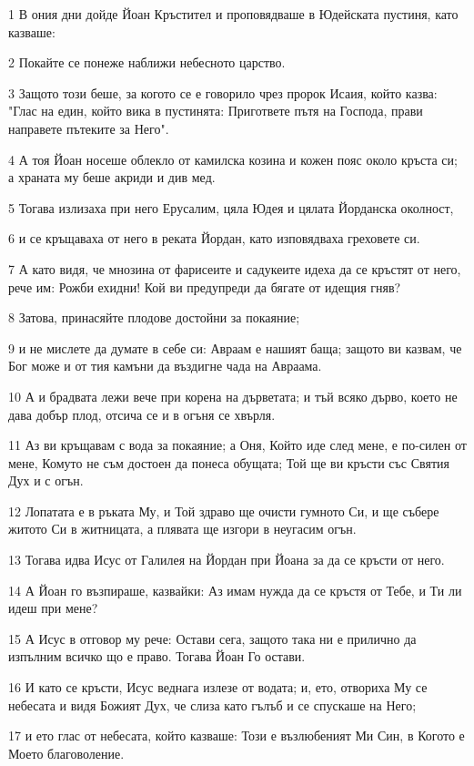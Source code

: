 \par 1 В ония дни дойде Йоан Кръстител и проповядваше в Юдейската пустиня, като казваше:
\par 2 Покайте се понеже наближи небесното царство.
\par 3 Защото този беше, за когото се е говорило чрез пророк Исаия, който казва: "Глас на един, който вика в пустинята: Пригответе пътя на Господа, прави направете пътеките за Него".
\par 4 А тоя Йоан носеше облекло от камилска козина и кожен пояс около кръста си; а храната му беше акриди и див мед.
\par 5 Тогава излизаха при него Ерусалим, цяла Юдея и цялата Йорданска околност,
\par 6 и се кръщаваха от него в реката Йордан, като изповядваха греховете си.
\par 7 А като видя, че мнозина от фарисеите и садукеите идеха да се кръстят от него, рече им: Рожби ехидни! Кой ви предупреди да бягате от идещия гняв?
\par 8 Затова, принасяйте плодове достойни за покаяние;
\par 9 и не мислете да думате в себе си: Авраам е нашият баща; защото ви казвам, че Бог може и от тия камъни да въздигне чада на Авраама.
\par 10 А и брадвата лежи вече при корена на дърветата; и тъй всяко дърво, което не дава добър плод, отсича се и в огъня се хвърля.
\par 11 Аз ви кръщавам с вода за покаяние; а Оня, Който иде след мене, е по-силен от мене, Комуто не съм достоен да понеса обущата; Той ще ви кръсти със Святия Дух и с огън.
\par 12 Лопатата е в ръката Му, и Той здраво ще очисти гумното Си, и ще събере житото Си в житницата, а плявата ще изгори в неугасим огън.
\par 13 Тогава идва Исус от Галилея на Йордан при Йоана за да се кръсти от него.
\par 14 А Йоан го възпираше, казвайки: Аз имам нужда да се кръстя от Тебе, и Ти ли идеш при мене?
\par 15 А Исус в отговор му рече: Остави сега, защото така ни е прилично да изпълним всичко що е право. Тогава Йоан Го остави.
\par 16 И като се кръсти, Исус веднага излезе от водата; и, ето, отвориха Му се небесата и видя Божият Дух, че слиза като гълъб и се спускаше на Него;
\par 17 и ето глас от небесата, който казваше: Този е възлюбеният Ми Син, в Когото е Моето благоволение.

